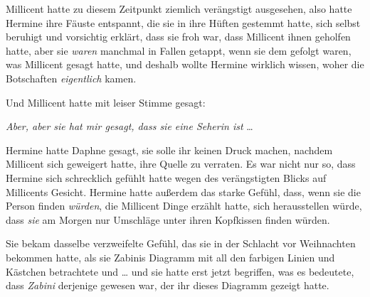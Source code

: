 Millicent hatte zu diesem Zeitpunkt ziemlich verängstigt ausgesehen, also hatte Hermine ihre Fäuste entspannt, die sie in ihre Hüften gestemmt hatte, sich selbst beruhigt und vorsichtig erklärt, dass sie froh war, dass Millicent ihnen geholfen hatte, aber sie \emph{waren} manchmal in Fallen getappt, wenn sie dem gefolgt waren, was Millicent gesagt hatte, und deshalb wollte Hermine wirklich wissen, woher die Botschaften \emph{eigentlich} kamen.

Und Millicent hatte mit leiser Stimme gesagt:

\emph{Aber, aber sie hat \emph{mir} gesagt, dass sie eine Seherin ist} …

Hermine hatte Daphne gesagt, sie solle ihr keinen Druck machen, nachdem Millicent sich geweigert hatte, ihre Quelle zu verraten. Es war nicht nur so, dass Hermine sich schrecklich gefühlt hatte wegen des verängstigten Blicks auf Millicents Gesicht. Hermine hatte außerdem das starke Gefühl, dass, wenn sie die Person finden \emph{würden}, die Millicent Dinge erzählt hatte, sich herausstellen würde, dass \emph{sie} am Morgen nur Umschläge unter ihren Kopfkissen finden würden.

Sie bekam dasselbe verzweifelte Gefühl, das sie in der Schlacht vor Weihnachten bekommen hatte, als sie Zabinis Diagramm mit all den farbigen Linien und Kästchen betrachtete und … und sie hatte erst jetzt begriffen, was es bedeutete, dass \emph{Zabini} derjenige gewesen war, der ihr dieses Diagramm gezeigt hatte.

